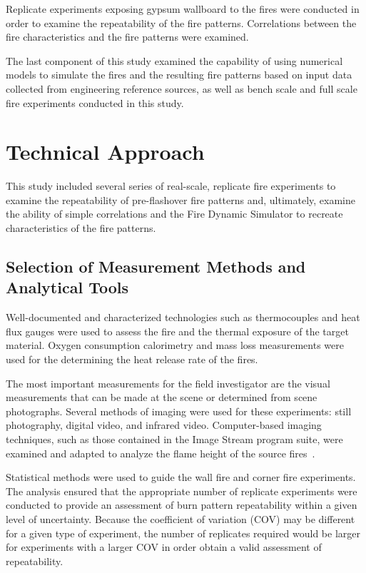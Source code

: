 \documentclass[twoside]{uocthesis}
\begin{document}
Replicate experiments exposing gypsum wallboard to the fires were conducted in order to examine the repeatability of the fire patterns.  Correlations between the fire characteristics and the fire patterns were examined.

The last component of this study examined the capability of using numerical models to simulate the fires and the resulting fire patterns based on input data collected from engineering reference sources, as well as bench scale and full scale fire experiments conducted in this study.

\section{Technical Approach}

This study included several series of real-scale, replicate fire experiments to examine the repeatability of pre-flashover fire patterns and, ultimately, examine the ability of simple correlations and the Fire Dynamic Simulator to recreate characteristics of the fire patterns.

\subsection{Selection of Measurement Methods and Analytical Tools}

Well-documented and characterized technologies such as thermocouples and heat flux gauges were used to assess the fire and the thermal exposure of the target material.  Oxygen consumption calorimetry and mass loss measurements were used for the determining the heat release rate of the fires.

The most important measurements for the field investigator are the visual measurements that can be made at the scene or determined from scene photographs. Several methods of imaging were used for these experiments: still photography, digital video, and infrared video.  Computer-based imaging techniques, such as those contained in the Image Stream program suite, were examined and adapted to analyze the flame height of the source fires~\cite{Nokes:2011}.

Statistical methods were used to guide the wall fire and corner fire experiments.  The analysis ensured that the appropriate number of replicate experiments were conducted to provide an assessment of burn pattern repeatability within a given level of uncertainty.  Because the coefficient of variation (COV) may be different for a given type of experiment, the number of replicates required would be larger for experiments with a larger COV in order obtain a valid assessment of repeatability.
\end{document}
